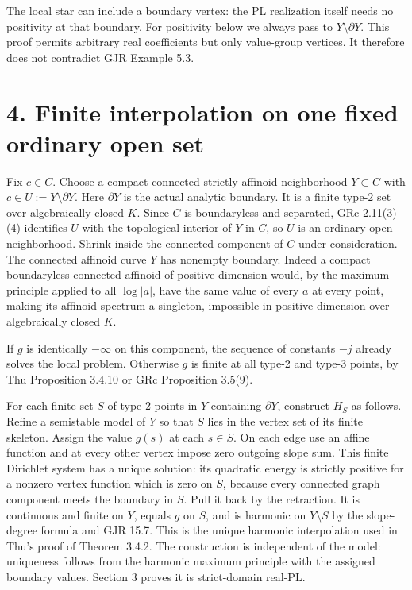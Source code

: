 \documentclass[11pt]{article}
\begin{document}
The local star can include a boundary vertex: the PL realization itself needs no positivity at that boundary. For positivity below we always pass to $Y\setminus\partial Y$. This proof permits arbitrary real coefficients but only value-group vertices. It therefore does not contradict GJR Example 5.3.

\section*{4. Finite interpolation on one fixed ordinary open set}

Fix $c\in C$. Choose a compact connected strictly affinoid neighborhood $Y\subset C$ with $c\in U:=Y\setminus\partial Y$. Here $\partial Y$ is the actual analytic boundary. It is a finite type-2 set over algebraically closed $K$. Since $C$ is boundaryless and separated, GRc 2.11(3)--(4) identifies $U$ with the topological interior of $Y$ in $C$, so $U$ is an ordinary open neighborhood. Shrink inside the connected component of $C$ under consideration. The connected affinoid curve $Y$ has nonempty boundary. Indeed a compact boundaryless connected affinoid of positive dimension would, by the maximum principle applied to all $\log|a|$, have the same value of every $a$ at every point, making its affinoid spectrum a singleton, impossible in positive dimension over algebraically closed $K$.

If $g$ is identically $-\infty$ on this component, the sequence of constants $-j$ already solves the local problem. Otherwise $g$ is finite at all type-2 and type-3 points, by Thu Proposition 3.4.10 or GRc Proposition 3.5(9).

For each finite set $S$ of type-2 points in $Y$ containing $\partial Y$, construct $H_S$ as follows. Refine a semistable model of $Y$ so that $S$ lies in the vertex set of its finite skeleton. Assign the value $g(s)$ at each $s\in S$. On each edge use an affine function and at every other vertex impose zero outgoing slope sum. This finite Dirichlet system has a unique solution: its quadratic energy is strictly positive for a nonzero vertex function which is zero on $S$, because every connected graph component meets the boundary in $S$. Pull it back by the retraction. It is continuous and finite on $Y$, equals $g$ on $S$, and is harmonic on $Y\setminus S$ by the slope-degree formula and GJR 15.7. This is the unique harmonic interpolation used in Thu's proof of Theorem 3.4.2. The construction is independent of the model: uniqueness follows from the harmonic maximum principle with the assigned boundary values. Section 3 proves it is strict-domain real-PL.
\end{document}
